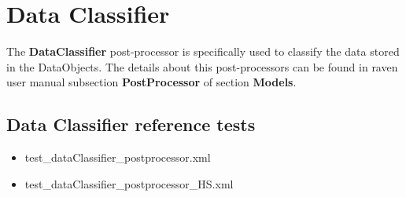 \section{Data Classifier}
\label{sec:dataClassifier}

The \textbf{DataClassifier} post-processor is specifically used to classify the data stored in the DataObjects. 
The details about this post-processors can be found in raven user manual subsection \textbf{PostProcessor}
of section \textbf{Models}.

\subsection{Data Classifier reference tests}
\begin{itemize}
	\item test\_dataClassifier\_postprocessor.xml
  \item test\_dataClassifier\_postprocessor\_HS.xml
\end{itemize}
